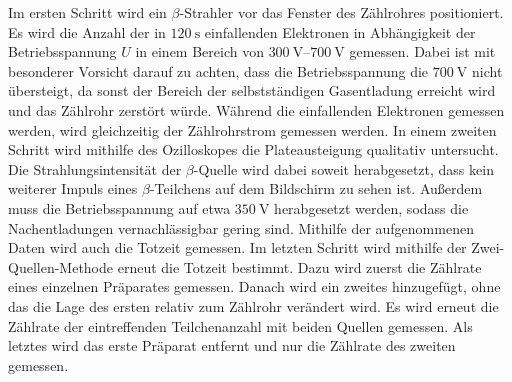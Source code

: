 Im ersten Schritt wird ein $\beta$-Strahler vor das Fenster des Zählrohres positioniert. Es wird die Anzahl der in $\SI{120}{\second}$ einfallenden Elektronen in Abhängigkeit der Betriebsspannung $U$ in
einem Bereich von $\SIrange{300}{700}{\volt}$ gemessen. Dabei ist mit besonderer Vorsicht darauf zu achten, dass die Betriebsspannung die $\SI{700}{\volt}$ nicht übersteigt, da sonst der
Bereich der selbstständigen Gasentladung erreicht wird und das Zählrohr zerstört würde.
Während die einfallenden Elektronen gemessen werden, wird gleichzeitig der Zählrohrstrom gemessen werden. \newline
In einem zweiten Schritt wird mithilfe des Ozilloskopes die Plateausteigung qualitativ untersucht. Die Strahlungsintensität der $\beta$-Quelle wird dabei soweit herabgesetzt, dass kein weiterer Impuls eines 
$\beta$-Teilchens auf dem Bildschirm zu sehen ist. Außerdem muss die Betriebsspannung auf etwa $\SI{350}{\volt}$ herabgesetzt werden, sodass die Nachentladungen vernachlässigbar gering sind.
Mithilfe der aufgenommenen Daten wird auch die Totzeit gemessen. \newline
Im letzten Schritt wird mithilfe der Zwei-Quellen-Methode erneut die Totzeit bestimmt. Dazu wird zuerst die Zählrate eines einzelnen Präparates gemessen. Danach wird ein zweites hinzugefügt, ohne das die Lage des ersten relativ zum Zählrohr verändert wird.
Es wird erneut die Zählrate der eintreffenden Teilchenanzahl mit beiden Quellen gemessen. Als letztes wird das erste Präparat entfernt und nur die Zählrate des zweiten gemessen.
